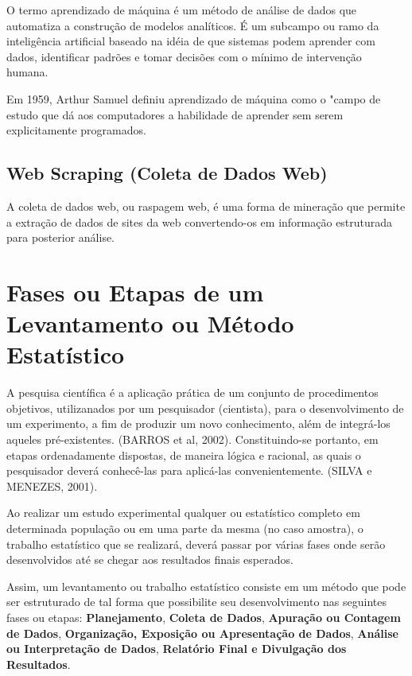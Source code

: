 O termo aprendizado de máquina é um método de análise de dados que automatiza a construção de modelos analíticos. É um subcampo ou ramo da inteligência artificial baseado na idéia de que sistemas podem aprender com dados, identificar padrões e tomar decisões com o mínimo de intervenção humana.\vskip0.3cm

Em 1959, Arthur Samuel definiu aprendizado de máquina como o "campo de estudo que dá aos computadores a habilidade de aprender sem serem explicitamente programados.





\subsection{Web Scraping (Coleta de Dados Web)}

A coleta de dados web, ou raspagem web, é uma forma de mineração que permite a extração de dados de sites da web convertendo-os em informação estruturada para posterior análise.


\section{Fases ou Etapas de um Levantamento ou Método Estatístico}

\inic A pesquisa científica é a aplicação prática de um conjunto de procedimentos objetivos, utilizanados por um pesquisador (cientista), para o desenvolvimento de um experimento, a fim de produzir um novo conhecimento, além de integrá-los aqueles pré-existentes. (BARROS et al, 2002). Constituindo-se portanto, em etapas ordenadamente dispostas, de maneira lógica e racional, as quais o pesquisador deverá conhecê-las para aplicá-las convenientemente. (SILVA e MENEZES, 2001). 
\vskip0.3cm


Ao realizar um estudo experimental qualquer ou estatístico completo em determinada população ou em uma parte da mesma (no caso amostra), o trabalho estatístico que se realizará, deverá passar por várias fases onde serão desenvolvidos até se chegar aos resultados finais esperados.\vskip0.3cm

Assim, um levantamento ou trabalho estatístico consiste em um
método que pode ser estruturado de tal forma que possibilite seu
desenvolvimento nas seguintes fases ou etapas:
\textbf{Planejamento}, \textbf{Coleta de Dados}, \textbf{Apuração
ou Contagem de Dados}, \textbf{Organização, Exposição ou
Apresentação de Dados}, \textbf{Análise ou Interpretação de
Dados}, \textbf{Relatório Final e Divulgação dos Resultados}.


